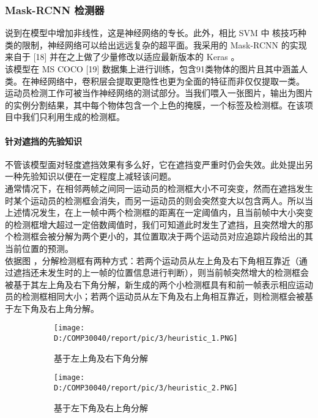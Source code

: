 \documentclass{article}
\begin{document}
\subsubsection{Mask-RCNN 检测器}
说到在模型中增加非线性，这是神经网络的专长。此外，相比 SVM 中 核技巧种类的限制，神经网络可以给出远远复杂的超平面。我采用的 Mask-RCNN 的实现来自于 [18] 并在之上做了少量修改以适应最新版本的 Keras 。\\
该模型在 MS COCO [19] 数据集上进行训练，包含91类物体的图片且其中涵盖人类。在神经网络中，卷积层会提取更隐性也更为全面的特征而非仅仅提取一类。\\
运动员检测工作可被当作神经网络的测试部分。当我们喂入一张图片，输出为图片的实例分割结果，其中每个物体包含一个上色的掩膜，一个标签及检测框。在该项目中我们只利用生成的检测框。
\paragraph{针对遮挡的先验知识}
不管该模型面对轻度遮挡效果有多么好，它在遮挡变严重时仍会失效。此处提出另一种先验知识以便在一定程度上减轻该问题。\\
通常情况下，在相邻两帧之间同一运动员的检测框大小不可突变，然而在遮挡发生时某个运动员的检测框会消失，而另一运动员的则会突然变大以包含两人。所以当上述情况发生，在上一帧中两个检测框的距离在一定阈值内，且当前帧中大小突变的检测框增大超过一定倍数阈值时，我们可知道此时发生了遮挡，且突然增大的那个检测框会被分解为两个更小的，其位置取决于两个运动员对应追踪片段给出的其当前位置的预测。\\
依据图 ，分解检测框有两种方式：若两个运动员从左上角及右下角相互靠近（通过遮挡还未发生时的上一帧的位置信息进行判断），则当前帧突然增大的检测框会被基于其左上角及右下角分解，新生成的两个小检测框具有和前一帧表示相应运动员的检测框相同大小；若两个运动员从左下角及右上角相互靠近，则检测框会被基于左下角及右上角分解。
\begin{figure}[h!]
  \begin{subfigure}[b]{\linewidth}
  \centering
    \texttt{[image: D:/COMP30040/report/pic/3/heuristic\_1.PNG]} 
    \caption{基于左上角及右下角分解}
  \end{subfigure}
  \begin{subfigure}[b]{\linewidth}
  \centering
    \texttt{[image: D:/COMP30040/report/pic/3/heuristic\_2.PNG]} 
    \caption{基于左下角及右上角分解}
  \end{subfigure}
  \caption{}
\end{figure}
\end{document}
